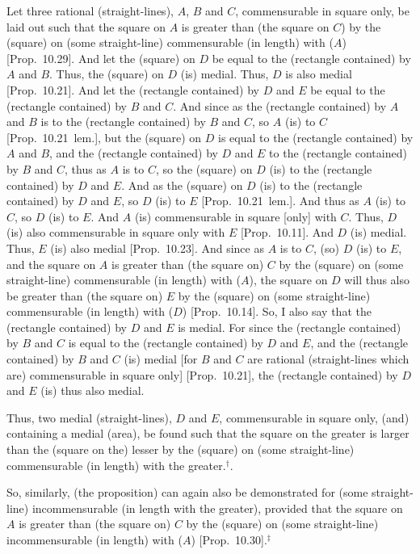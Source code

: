 \begin{Parallel}{}{}
{\epsfysize=0.75in
\centerline{}

Let three rational (straight-lines), $A$, $B$ and $C$, commensurable
in square only, be laid out such that the square on $A$ is greater
than (the square on $C$) by the (square) on (some straight-line)
commensurable (in length) with ($A$) [Prop.~10.29].
And let the (square) on $D$ be equal to the (rectangle contained) by $A$ and
$B$. Thus, the (square) on $D$ (is) medial. Thus, $D$ is also
medial [Prop.~10.21].  And let the 
(rectangle contained) by $D$ and $E$ be equal to the (rectangle contained)
by $B$ and $C$. And since as the (rectangle contained) by $A$ and $B$
is to the (rectangle contained) by $B$ and $C$, so $A$ (is) to $C$
[Prop.~10.21~lem.], but the (square) on $D$
is equal to the (rectangle contained) by $A$ and $B$, and the
(rectangle contained) by $D$ and $E$ to the (rectangle contained) by
$B$ and $C$, thus as $A$ is to $C$, so the (square) on $D$ (is) to
the (rectangle contained) by $D$ and $E$. And as the (square) on $D$
(is) to the (rectangle contained) by $D$ and $E$, so $D$ (is) to $E$ [Prop.~10.21~lem.]. And thus as
$A$ (is) to $C$, so $D$ (is) to $E$. And $A$ (is) commensurable in square
[only] with $C$. Thus, $D$ (is) also commensurable in square only
with $E$ [Prop.~10.11]. And $D$ (is) medial.
Thus, $E$ (is) also medial [Prop.~10.23]. And
since as $A$ is to $C$, (so) $D$ (is) to $E$, and the square on $A$
is greater than (the square on) $C$ by the (square)
on (some straight-line) commensurable (in length) with ($A$),  the square on $D$
will thus also be greater than (the square on) $E$ by the (square) on (some straight-line)
commensurable (in length) with ($D$) [Prop.~10.14].
So, I also say that the (rectangle contained) by $D$ and $E$ is medial.
For since the (rectangle contained) by $B$ and $C$ is equal to the
(rectangle contained) by $D$ and $E$, and the (rectangle contained)
by $B$ and $C$ (is) medial [for $B$ and $C$ are rational
(straight-lines which are) commensurable in square only] [Prop.~10.21], the (rectangle contained) by $D$ and
$E$ (is) thus also medial.

Thus, two medial (straight-lines), $D$ and $E$, commensurable in square only, (and) containing a medial (area), be found such that
the square on the greater is larger than the (square on the) lesser by the
(square) on (some straight-line) commensurable (in length) with the greater.$^\dag$.

So, similarly, (the proposition) can again also be demonstrated for
(some straight-line) incommensurable (in length with the greater), provided that
the square on $A$ is greater than (the square on) $C$ by the (square)
on (some straight-line) incommensurable (in length) with ($A$) [Prop.~10.30].$^\ddag$}
\end{Parallel}
